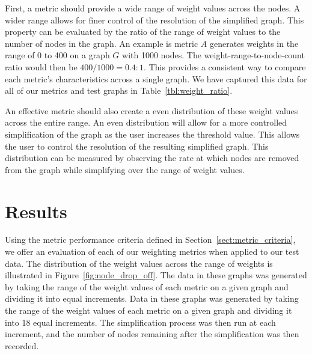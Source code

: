 First, a metric should provide a wide range of weight values across the nodes.  A wider range allows for finer control of the resolution of the simplified graph. This property can be evaluated by the ratio of the range of weight values to the number of nodes in the graph. An example is metric $A$ generates weights in the range of 0 to 400 on a graph $G$ with 1000 nodes.  The weight-range-to-node-count ratio would then be $400/1000 = 0.4:1$.  This provides a consistent way to compare each metric's characteristics across a single graph.  We have captured this data for all of our metrics and test graphs in Table~\ref{tbl:weight_ratio}.

An effective metric should also create a even distribution of these weight values across the entire range.  An even distribution will allow for a more controlled simplification of the graph as the user increases the threshold value.  This allows the user to control the resolution of the resulting
simplified graph.  This distribution can be measured by observing the rate at which nodes are removed from the graph while simplifying over the range of weight values.  


\section{Results}
\label{sect:Results}
Using the metric performance criteria defined in Section~\ref{sect:metric_criteria}, we offer an evaluation of each of our weighting metrics when applied to our test data.  The distribution of the weight values across the range of weights is illustrated in Figure~\ref{fig:node_drop_off}.  The data in these graphs was generated by taking the range of the weight values of each metric on a given graph and dividing it into equal increments.  Data in these graphs was generated by taking the range of the weight values of each metric on a given graph and dividing it into 18 equal increments.  The simplification process was then run at each increment, and the number of nodes remaining after the simplification was then recorded.

